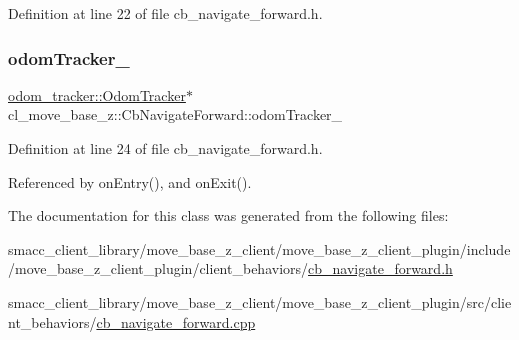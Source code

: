 Definition at line 22 of file cb\+\_\+navigate\+\_\+forward.\+h.

\mbox{\label{classcl__move__base__z_1_1CbNavigateForward_a7583a4d669af48618bd45950db8e5292}} 
\subsubsection{\texorpdfstring{odom\+Tracker\+\_\+}{odomTracker\_}}
{\footnotesize\ttfamily \hyperlink{classcl__move__base__z_1_1odom__tracker_1_1OdomTracker}{odom\+\_\+tracker\+::\+Odom\+Tracker}$\ast$ cl\+\_\+move\+\_\+base\+\_\+z\+::\+Cb\+Navigate\+Forward\+::odom\+Tracker\+\_\+}



Definition at line 24 of file cb\+\_\+navigate\+\_\+forward.\+h.



Referenced by on\+Entry(), and on\+Exit().



The documentation for this class was generated from the following files\+:\begin{DoxyCompactItemize}
\item 
smacc\+\_\+client\+\_\+library/move\+\_\+base\+\_\+z\+\_\+client/move\+\_\+base\+\_\+z\+\_\+client\+\_\+plugin/include/move\+\_\+base\+\_\+z\+\_\+client\+\_\+plugin/client\+\_\+behaviors/\hyperlink{cb__navigate__forward_8h}{cb\+\_\+navigate\+\_\+forward.\+h}\item 
smacc\+\_\+client\+\_\+library/move\+\_\+base\+\_\+z\+\_\+client/move\+\_\+base\+\_\+z\+\_\+client\+\_\+plugin/src/client\+\_\+behaviors/\hyperlink{cb__navigate__forward_8cpp}{cb\+\_\+navigate\+\_\+forward.\+cpp}\end{DoxyCompactItemize}
